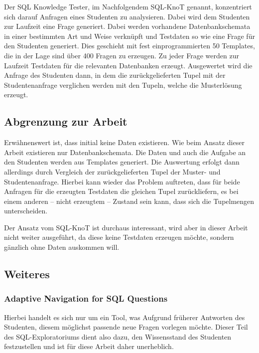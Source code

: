 Der SQL Knowledge Tester, im Nachfolgendem SQL-KnoT genannt, konzentriert sich darauf Anfragen eines Studenten zu analysieren. Dabei wird dem Studenten zur Laufzeit eine Frage generiert. Dabei werden vorhandene Datenbankschemata in einer bestimmten Art und Weise verknüpft und Testdaten so wie eine Frage für den Studenten generiert. Dies geschieht mit fest einprogrammierten 50 Templates, die in der Lage sind über 400 Fragen zu erzeugen. Zu jeder Frage werden zur Laufzeit Testdaten für die relevanten Datenbanken erzeugt. Ausgewertet wird die Anfrage des Studenten dann, in dem die zurückgelieferten Tupel mit der Studentenanfrage verglichen werden mit den Tupeln, welche die Musterlösung erzeugt. 

\subsection*{Abgrenzung zur Arbeit}

Erwähnenswert ist, dass initial keine Daten existieren. Wie beim Ansatz dieser Arbeit existieren nur Datenbankschemata. Die Daten und auch die Aufgabe an den Studenten werden aus Templates generiert. Die Auswertung erfolgt dann allerdings durch Vergleich der zurückgelieferten Tupel der Muster- und Studentenanfrage. Hierbei kann wieder das Problem auftreten, dass für beide Anfragen für die erzeugten Testdaten die gleichen Tupel zurückliefern, es bei einem anderen -- nicht erzeugtem -- Zustand sein kann, dass sich die Tupelmengen unterscheiden.

Der Ansatz vom SQL-KnoT ist durchaus interessant, wird aber in dieser Arbeit nicht weiter ausgeführt, da diese keine Testdaten erzeugen möchte, sondern gänzlich ohne Daten auskommen will.

\subsection{Weiteres}

\subsubsection{Adaptive Navigation for SQL Questions}

Hierbei handelt es sich nur um ein Tool, was Aufgrund früherer Antworten des Studenten, diesem möglichst passende neue Fragen vorlegen möchte. Dieser Teil des SQL-Exploratoriums dient also dazu, den Wissensstand des Studenten festzustellen und ist für diese Arbeit daher unerheblich.

